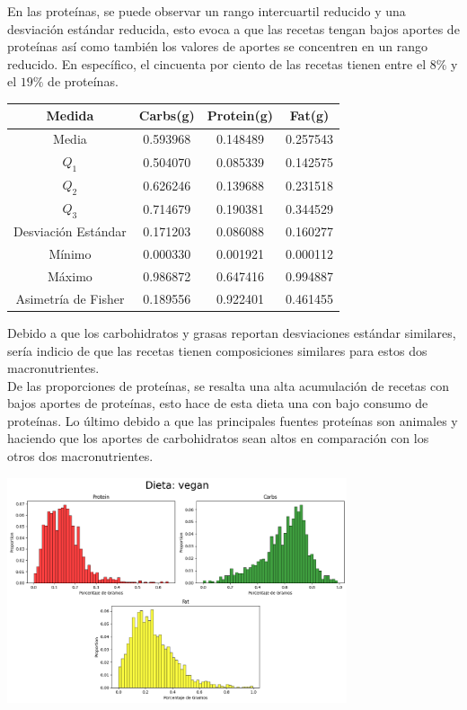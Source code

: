 \documentclass[12pt,a4paper]{article}
\begin{document}
        En las proteínas, se puede observar un rango intercuartil reducido y una 
        desviación estándar reducida, esto evoca a que las recetas tengan bajos 
        aportes de proteínas así como también los valores de aportes se concentren 
        en un rango reducido. En específico, el cincuenta por ciento de las recetas 
        tienen entre el $8\%$ y el $19\%$ de proteínas.
        \begin{center}
            \begin{tabular}{|c|ccc|}
                \hline
                Medida & Carbs(g) & Protein(g) & Fat(g) \\
                \hline
                Media               & 0.593968 & 0.148489 & 0.257543  \\
                $Q_1$               & 0.504070 & 0.085339 & 0.142575  \\
                $Q_2$               & 0.626246 & 0.139688 & 0.231518  \\
                $Q_3$               & 0.714679 & 0.190381 & 0.344529  \\
                Desviación Estándar & 0.171203 & 0.086088 & 0.160277  \\
                Mínimo              & 0.000330 & 0.001921 & 0.000112  \\
                Máximo              & 0.986872 & 0.647416 & 0.994887  \\
                Asimetría de Fisher & 0.189556 & 0.922401 & 0.461455  \\
                \hline
            \end{tabular}
        \end{center}
        Debido a que los carbohidratos y grasas reportan desviaciones estándar 
        similares, sería indicio de que las recetas tienen composiciones similares 
        para estos dos macronutrientes.\\

        De las proporciones de proteínas, se resalta una alta acumulación de 
        recetas con bajos aportes de proteínas, esto hace de esta dieta una 
        con bajo consumo de proteínas. Lo último debido a que las principales 
        fuentes proteínas son animales y haciendo que los aportes de carbohidratos 
        sean altos en comparación con los otros dos macronutrientes.
        \begin{center}
            \includegraphics[width=0.75\textwidth]{Resources/2_03_plot_05.png}
        \end{center}
\end{document}
